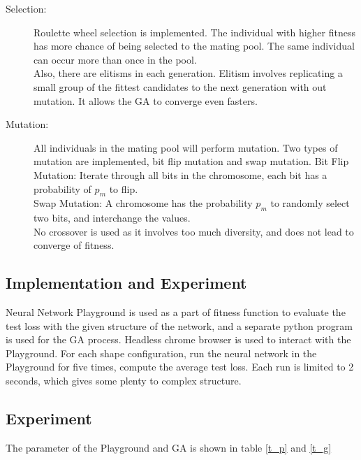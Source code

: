 \documentclass[12pt]{article}
\begin{document}
\begin{description}
\item[Selection: ]
Roulette wheel selection is implemented. The individual with higher fitness has more chance of being selected to the mating pool. The same individual can occur more than once in the pool.\\

Also, there are elitisms in each generation. 
Elitism involves replicating a small group of the fittest candidates to the next generation with out mutation. It allows the GA to converge even fasters.


\end{description}
\begin{description}
\item[Mutation: ]
All individuals in the mating pool will perform mutation.
Two types of mutation are implemented, bit flip mutation and swap mutation. 
Bit Flip Mutation: Iterate through all bits in the chromosome, each bit has a probability of $p_m$ to flip.\\
Swap Mutation: A chromosome has the probability $p_m$ to randomly select two bits, and interchange the values.\\
No crossover is used as it involves too much diversity, and does not lead to converge of fitness.
\end{description}

\subsection{Implementation and Experiment}
Neural Network Playground is used as a part of fitness function to evaluate the test loss with the given structure of the network, and a separate python program is used for the GA process.
Headless chrome browser is used to interact with the Playground. For each shape configuration, run the neural network in the Playground for five times, compute the average test loss. Each run is limited to 2 seconds, which gives some plenty to complex structure.

\subsection{Experiment}
The parameter of the Playground and GA is shown in table \ref{t_p} and \ref{t_g}
\end{document}
